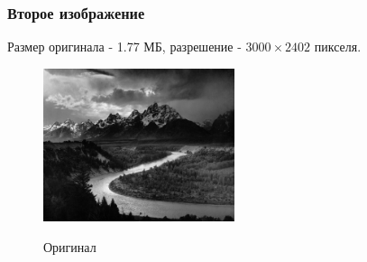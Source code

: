 \documentclass[a4paper]{article}
\begin{document}
\subsubsection{Второе изображение}
Размер оригинала - 1.77 МБ, разрешение - $3000\times 2402$ пикселя.
\begin{figure}[H]
\centering
\caption{Оригинал}
    \includegraphics[width = 0.5\textwidth]{resources/Adams_The_Tetons_and_the_Snake_River.jpg}
    \label{fig:mount_orig}
\end{figure}
\end{document}
